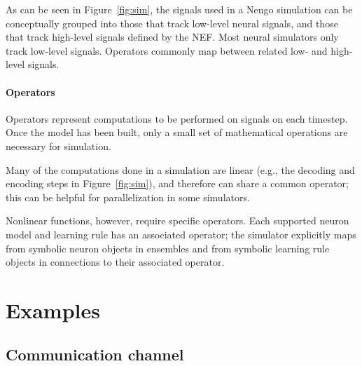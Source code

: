 \documentclass{frontiersSCNS}
\begin{document}
As can be seen in Figure~\ref{fig:sim},
the signals used in a Nengo simulation
can be conceptually grouped into
those that track low-level neural signals,
and those that track high-level signals
defined by the NEF.
Most neural simulators only track
low-level signals.
Operators commonly map
between related low- and high-level signals.

\paragraph{Operators}

Operators represent computations
to be performed on signals on each timestep.
Once the model has been built,
only a small set of mathematical
operations are necessary for simulation.

Many of the computations
done in a simulation
are linear (e.g.,
the decoding and encoding steps
in Figure~\ref{fig:sim}),
and therefore can share a common operator;
this can be helpful for parallelization
in some simulators.

Nonlinear functions, however,
require specific operators.
Each supported neuron model and learning rule
has an associated operator;
the simulator explicitly maps
from symbolic neuron objects in ensembles
and from symbolic learning rule objects
in connections to their associated operator.

\section{Examples} \label{sec:examples}

\subsection{Communication channel} \label{sec:comm-channel}
\end{document}

